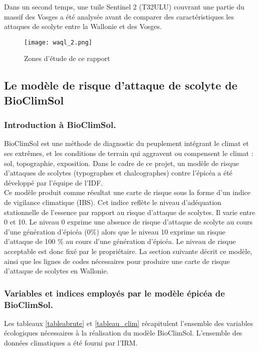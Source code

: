 Dans un second temps, une tuile Sentinel 2 (T32ULU) couvrant une partie du massif des Vosges a été analysée avant de comparer des caractéristiques les attaques de scolyte entre la Wallonie et des Vosges.

\begin{figure} [htbp] 
    \centering
    \texttt{[image: waql\_2.png]}
    \caption{Zones d'étude de ce rapport}
    \label{fig:T31}
\end{figure}
 

 \newpage
\subsection{Le modèle de risque d'attaque de scolyte de BioClimSol}
 
 \subsubsection{Introduction à BioClimSol.}
 BioClimSol est une méthode de diagnostic du peuplement
 intégrant le climat et ses extrêmes, et les conditions de terrain qui aggravent ou compensent le climat : sol, topographie, exposition.
Dans le cadre de ce projet, un modèle de risque d’attaques de scolytes (typographes et chalcographes) contre l’épicéa a été développé par l'équipe de l'IDF. \\


Ce modèle produit comme résultat une carte de risque sous la forme d'un indice de vigilance climatique (IBS). Cet indice reflète le niveau d'adéquation stationnelle de l'essence par rapport au risque d'attaque de scolytes. Il varie entre 0 et 10. Le niveau 0 exprime une absence de risque d'attaque de scolyte au cours d'une génération d'épicéa (0\%) alors que le niveau 10 exprime un risque d'attaque de 100 \% au cours d'une génération d'épicéa. Le niveau de risque acceptable est donc fixé par le propriétaire.
La section suivante décrit ce modèle, ainsi que les lignes de codes nécessaires pour produire une carte de risque d'attaque de scolytes en Wallonie.

\subsubsection{Variables et indices employés par le modèle épicéa de BioClimSol.}


Les tableaux \ref{tableabrute} et \ref{tableau_clim} récapitulent l'ensemble des variables écologiques nécessaires à la réalisation du modèle BioClimSol. L'ensemble des données climatiques a été fourni par l'IRM.


